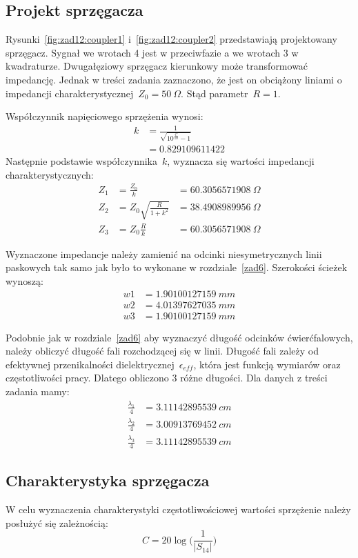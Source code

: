 \documentclass[rep.tex]{subfiles}
\begin{document}
\subsection{Projekt sprzęgacza}
Rysunki~\ref{fig:zad12:coupler1} i~\ref{fig:zad12:coupler2} przedstawiają projektowany sprzęgacz.
Sygnał we wrotach 4 jest w przeciwfazie a we wrotach 3 w kwadraturze.
Dwugałęziowy sprzęgacz kierunkowy może transformować impedancję.
Jednak w treści zadania zaznaczono, że jest on obciążony liniami o impedancji charakterystycznej~$Z_0 = 50~\Omega$.
Stąd parametr~$R = 1$.

Współczynnik napięciowego sprzężenia wynosi:
\begin{align}
  k &= \frac{1}{\sqrt{10^{\frac{C}{10}} - 1}} \\
  &= 0.829109611422 \nonumber
\end{align}
Następnie podstawie współczynnika~$k$, wyznacza się wartości impedancji charakterystycznych:
\begin{align}
  Z_1 &= \frac{Z_0}{k} &= 60.3056571908~\Omega \\
  Z_2 &= Z_0\sqrt{\frac{R}{1 + k^2}} &= 38.4908989956~\Omega \\
  Z_3 &= Z_0\frac{R}{k} &= 60.3056571908~\Omega
\end{align}

Wyznaczone impedancje należy zamienić na odcinki niesymetrycznych linii paskowych tak samo jak było to wykonane w rozdziale~\ref{zad6}.
Szerokości ścieżek wynoszą:
\begin{align}
  w1 &= 1.90100127159~mm \nonumber \\
  w2 &= 4.01397627035~mm \nonumber \\
  w3 &= 1.90100127159~mm \nonumber
\end{align}

Podobnie jak w rozdziale~\ref{zad6} aby wyznaczyć długość odcinków ćwierćfalowych, należy obliczyć długość fali rozchodzącej się w linii.
Długość fali zależy od efektywnej przenikalności dielektrycznej~$\epsilon_{eff}$, która jest funkcją wymiarów oraz częstotliwości pracy.
Dlatego obliczono 3 różne długości.
Dla danych z treści zadania mamy:
\begin{align}
  \frac{\lambda_1}{4} &= 3.11142895539~cm \nonumber \\
  \frac{\lambda_2}{4} &= 3.00913769452~cm \nonumber \\
  \frac{\lambda_3}{4} &= 3.11142895539~cm \nonumber 
\end{align}

\subsection{Charakterystyka sprzęgacza}
W celu wyznaczenia charakterystyki częstotliwościowej wartości sprzężenie należy posłużyć się zależnością:
\begin{equation}
  C = 20 \log\Big(\frac{1}{|S_{14}|}\Big) \label{eqn:zad12:C}
\end{equation}
\end{document}
